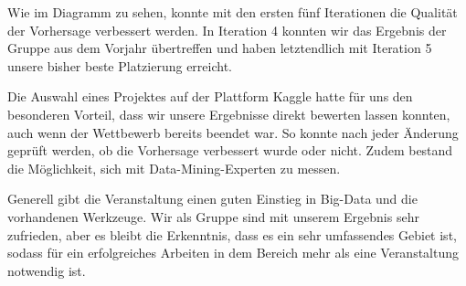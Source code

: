 Wie im Diagramm zu sehen, konnte mit den ersten fünf Iterationen die Qualität der Vorhersage verbessert werden. In Iteration 4 konnten wir das Ergebnis der Gruppe aus dem Vorjahr übertreffen und haben letztendlich mit Iteration 5 unsere bisher beste Platzierung erreicht.

Die Auswahl eines Projektes auf der Plattform Kaggle hatte für uns den besonderen Vorteil, dass wir unsere Ergebnisse direkt bewerten lassen konnten, auch wenn der Wettbewerb bereits beendet war. So konnte nach jeder Änderung geprüft werden, ob die Vorhersage verbessert wurde oder nicht. Zudem bestand die Möglichkeit, sich mit Data-Mining-Experten zu messen.

Generell gibt die Veranstaltung einen guten Einstieg in Big-Data und die vorhandenen Werkzeuge. Wir als Gruppe sind mit unserem Ergebnis sehr zufrieden, aber es bleibt die Erkenntnis, dass es ein sehr umfassendes Gebiet ist, sodass für ein erfolgreiches Arbeiten in dem Bereich mehr als eine Veranstaltung notwendig ist.
